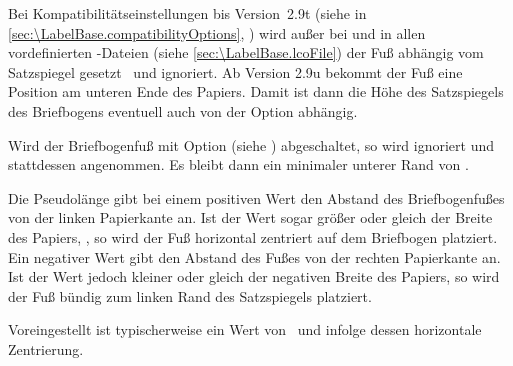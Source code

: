 Bei
Kompatibilitätseinstellungen bis
Version~2.9t (siehe  in
\autoref{sec:\LabelBase.compatibilityOptions},
) wird außer bei  und
 in allen vordefinierten
-Dateien
(siehe \autoref{sec:\LabelBase.lcoFile}) der Fuß abhängig vom Satzspiegel
gesetzt%
\iffalse %
. Damit hat dann auch \DescRef{\LabelBase.option.enlargefirstpage}%
\important{\DescRef{\LabelBase.option.enlargefirstpage}} keine Wirkung. %
\else %
\ und %
 ignoriert. %
\fi %
Ab
Version 2.9u bekommt der Fuß eine Position am unteren Ende des Papiers. Damit
ist dann die Höhe des Satzspiegels des Briefbogens eventuell auch von der
Option  abhängig.

Wird der Briefbogenfuß mit Option
%
%
(siehe ) abgeschaltet, so wird
 ignoriert und stattdessen
 angenommen. Es bleibt dann
ein minimaler unterer Rand von .%
\EndIndexGroup


\begin{Declaration}
\end{Declaration}
Die Pseudolänge
 gibt bei einem
positiven Wert den Abstand des Briefbogenfußes von der linken Papierkante
an. Ist der Wert sogar größer oder gleich der Breite des Papiers,
, so wird der Fuß horizontal
zentriert auf dem Briefbogen platziert. Ein negativer Wert gibt den Abstand
des Fußes von der rechten Papierkante an. Ist der Wert jedoch kleiner oder
gleich der negativen Breite des Papiers, so wird der Fuß bündig zum linken
Rand des Satzspiegels platziert.

Voreingestellt ist typischerweise ein Wert von
%
\iffalse %
, also der größtmögliche Wert für eine Länge%
\fi%
\ und infolge dessen horizontale Zentrierung.%
\EndIndexGroup


